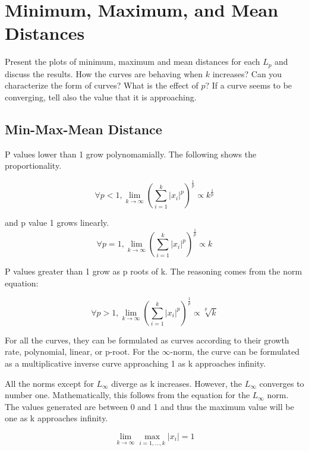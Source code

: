 \section{Minimum, Maximum, and Mean Distances}
Present the plots of minimum, maximum and mean distances for each \( L_p \) and discuss the results. How the curves are behaving when \( k \) increases? Can you characterize the form of curves? What is the effect of \( p \)? If a curve seems to be converging, tell also the value that it is approaching.
\subsection{Min-Max-Mean Distance}

P values lower than 1 grow polynomamially.
The following shows the proportionality.

\begin{equation}
    \forall p < 1, \lim_{k \to \infty} \left( \sum_{i=1}^{k} |x_i|^p \right)^{\frac{1}{p}} \propto k^{\frac{1}{p}}
\end{equation}

and p value 1 grows linearly.
\begin{equation}
    \forall p = 1, \lim_{k \to \infty} \left( \sum_{i=1}^{k} |x_i|^p \right)^{\frac{1}{p}} \propto k
\end{equation}

P values greater than 1 grow as p roots of k. The reasoning comes from the norm equation:

\begin{equation}
    \forall p > 1, \lim_{k \to \infty} \left( \sum_{i=1}^{k} |x_i|^p \right)^{\frac{1}{p}} \propto \sqrt[p]{k}
\end{equation}

For all the curves, they can be formulated as curves according to their growth rate, polynomial, linear, or p-root. For the \(\infty\)-norm, the curve can be formulated as a multiplicative inverse curve approaching 1 as k approaches infinity.



All the norms except for \( L_\infty \) diverge as k increases. However, the \( L_\infty \) converges to number one. Mathematically, this follows from the equation for the \( L_\infty \) norm. The values generated are between 0 and 1 and thus the maximum value will be one as k approaches infinity.



\begin{equation}
    \lim_{k \to \infty} \max_{i=1,\ldots,k} |x_i| = 1
\end{equation}

